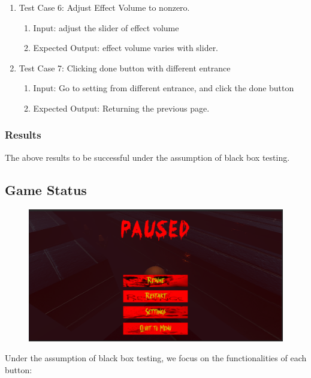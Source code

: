 \documentclass[11pt]{article}
\begin{document}
\begin{enumerate}
        \item Test Case 6: Adjust Effect Volume to nonzero.
        \begin{enumerate}
            \item Input: adjust the slider of effect volume
            \item Expected Output: effect volume varies with slider.
        \end{enumerate}

        \item Test Case 7: Clicking done button with different entrance
        \begin{enumerate}
            \item Input: Go to setting from different entrance, and click the done button
            \item Expected Output: Returning the previous page.
        \end{enumerate}
    \end{enumerate}

    \subsubsection*{Results}

    The above results to be successful under the assumption of black box testing.

    \subsection{Game Status}

    \begin{figure}[H]
        \centering
        \includegraphics*[scale=0.4]{Pause.png}
    \end{figure}

    Under the assumption of black box testing, we focus on the functionalities of each button:
\end{document}
